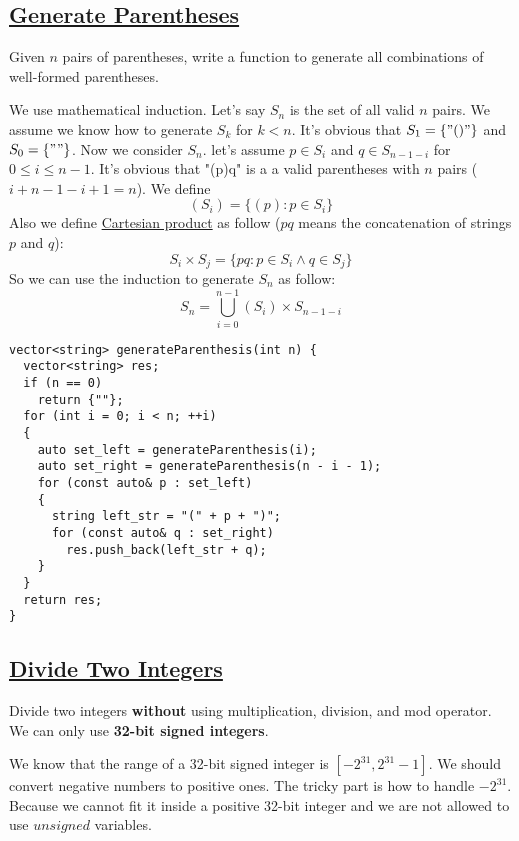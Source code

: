 \documentclass{book}
\begin{document}
	\subsection{\href{https://leetcode.com/problems/generate-parentheses/}{Generate Parentheses}}
	 Given $n$ pairs of parentheses, write a function to generate all combinations of well-formed parentheses.
	 \par We use mathematical induction. Let's say $S_n$ is the set of all valid $n$ pairs. We assume we know how to generate $S_k$ for $k < n$. It's obvious that $S_1 = \{"()"\}$ and $S_0 = \{""\}$. Now we consider $S_n$. let's assume $p \in S_i$ and $q \in S_{n - 1 - i}$ for $0 \le i \le n - 1$. It's obvious that "(p)q" is a a valid parentheses with $n$ pairs ($i + n - 1 - i + 1 = n$). We define
	 \begin{equation*}
	 	(S_i) = \{(p) : p \in S_i\}
	 \end{equation*}
 	 Also we define \href{https://en.wikipedia.org/wiki/Cartesian_product}{Cartesian product} as follow ($pq$ means the concatenation of strings $p$ and $q$):
 	 \begin{equation*}
 	 	S_i \times S_j = \{pq : p \in S_i \land q \in S_j\}
 	 \end{equation*}
  	 So we can use the induction to generate $S_n$ as follow:
	 \begin{equation*}
	 	S_n = \bigcup_{i = 0}^{n - 1}{(S_i) \times S_{n - 1 - i}}
	 \end{equation*}
 	\begin{lstlisting}
vector<string> generateParenthesis(int n) {
  vector<string> res;
  if (n == 0)
    return {""};
  for (int i = 0; i < n; ++i)
  {
    auto set_left = generateParenthesis(i);
    auto set_right = generateParenthesis(n - i - 1);
    for (const auto& p : set_left)
    {
      string left_str = "(" + p + ")";
      for (const auto& q : set_right)
        res.push_back(left_str + q);
    }
  }
  return res;
}
 	\end{lstlisting}
	\subsection{\href{https://leetcode.com/problems/divide-two-integers/}{Divide Two Integers}}
	Divide two integers \textbf{without} using multiplication, division, and mod operator. We can only use \textbf{32-bit signed integers}.
	\par We know that the range of a 32-bit signed integer is $[-2^{31}, 2^{31} - 1]$. We should convert negative numbers to positive ones. The tricky part is how to handle $-2^{31}$. Because we cannot fit it inside a positive 32-bit integer and we are not allowed to use $unsigned$ variables.
\end{document}
